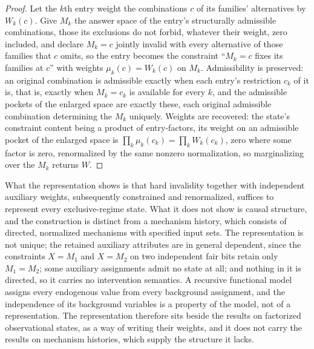 \documentclass[11pt]{article}
\begin{document}
\begin{proof}
Let the $k$th entry weight the combinations $c$ of its families' alternatives by $W_k(c)$. Give $M_k$ the answer space of the entry's structurally admissible combinations, those its exclusions do not forbid, whatever their weight, zero included, and declare $M_k = c$ jointly invalid with every alternative of those families that $c$ omits, so the entry becomes the constraint ``$M_k = c$ fixes its families at $c$'' with weights $\mu_k(c) = W_k(c)$ on $M_k$. Admissibility is preserved: an original combination is admissible exactly when each entry's restriction $c_k$ of it is, that is, exactly when $M_k = c_k$ is available for every $k$, and the admissible pockets of the enlarged space are exactly these, each original admissible combination determining the $M_k$ uniquely. Weights are recovered: the state's constraint content being a product of entry-factors, its weight on an admissible pocket of the enlarged space is $\prod_k \mu_k(c_k) = \prod_k W_k(c_k)$, zero where some factor is zero, renormalized by the same nonzero normalization, so marginalizing over the $M_k$ returns $W$.
\end{proof}

\noindent What the representation shows is that hard invalidity together with independent auxiliary weights, subsequently constrained and renormalized, suffices to represent every exclusive-regime state. What it does not show is causal structure, and the construction is distinct from a mechanism history, which consists of directed, normalized mechanisms with specified input sets. The representation is not unique; the retained auxiliary attributes are in general dependent, since the constraints $X = M_1$ and $X = M_2$ on two independent fair bits retain only $M_1 = M_2$; some auxiliary assignments admit no state at all; and nothing in it is directed, so it carries no intervention semantics. A recursive functional model assigns every endogenous value from every background assignment, and the independence of its background variables is a property of the model, not of a representation. The representation therefore sits beside the results on factorized observational states, as a way of writing their weights, and it does not carry the results on mechanism histories, which supply the structure it lacks.
\end{document}
